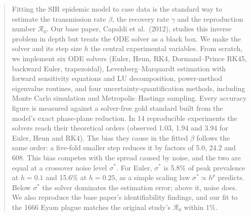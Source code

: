 \documentclass[sigconf]{acmart}
\begin{document}
\begin{abstract}
Fitting the SIR epidemic model to case data is the standard way to
estimate the transmission rate $\beta$, the recovery rate $\gamma$ and
the reproduction number $\mathcal{R}_0$. Our base paper, Capaldi et
al.\ (2012), studies this inverse problem in depth but treats the ODE
solver as a black box. We make the solver and its step size $h$ the
central experimental variables. From scratch, we implement six ODE
solvers (Euler, Heun, RK4, Dormand--Prince RK45, backward Euler,
trapezoidal), Levenberg--Marquardt estimation with forward sensitivity
equations and LU decomposition, power-method eigenvalue routines, and
four uncertainty-quantification methods, including Monte Carlo
simulation and Metropolis--Hastings sampling. Every accuracy figure is
measured against a solver-free gold standard built from the model's
exact phase-plane reduction. In 14 reproducible experiments the solvers
reach their theoretical orders (observed 1.03, 1.94 and 3.94 for Euler,
Heun and RK4). The bias they cause in the fitted $\beta$ follows the
same order: a five-fold smaller step reduces it by factors of 5.0, 24.2
and 608. This bias competes with the spread caused by noise, and the
two are equal at a crossover noise level $\sigma^*$. For Euler,
$\sigma^*$ is 5.8\% of peak prevalence at $h=0.1$ and 15.6\% at
$h=0.25$, as a simple scaling law $\sigma^*\propto h^p$ predicts. Below
$\sigma^*$ the solver dominates the estimation error; above it, noise
does. We also reproduce the base paper's identifiability findings, and
our fit to the 1666 Eyam plague matches the original study's
$\mathcal{R}_0$ within 1\%.
\end{abstract}


\begin{teaserfigure}
  \centering
  \setlength{\fboxsep}{7pt}\setlength{\fboxrule}{1.2pt}%
\end{teaserfigure}
\end{document}
